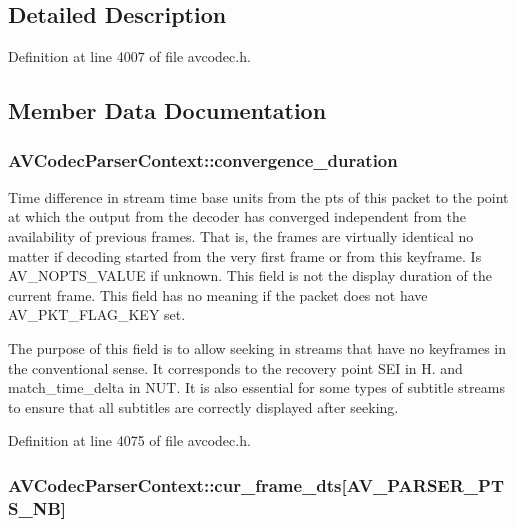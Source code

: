 \subsection{Detailed Description}


Definition at line 4007 of file avcodec.\+h.



\subsection{Member Data Documentation}
\subsubsection[{\texorpdfstring{convergence\+\_\+duration}{convergence_duration}}]{ A\+V\+Codec\+Parser\+Context\+::convergence\+\_\+duration}\hypertarget{struct_a_v_codec_parser_context_a720d361a167efcd43612fcf6ec57a2af}{}\label{struct_a_v_codec_parser_context_a720d361a167efcd43612fcf6ec57a2af}
Time difference in stream time base units from the pts of this packet to the point at which the output from the decoder has converged independent from the availability of previous frames. That is, the frames are virtually identical no matter if decoding started from the very first frame or from this keyframe. Is A\+V\+\_\+\+N\+O\+P\+T\+S\+\_\+\+V\+A\+L\+UE if unknown. This field is not the display duration of the current frame. This field has no meaning if the packet does not have A\+V\+\_\+\+P\+K\+T\+\_\+\+F\+L\+A\+G\+\_\+\+K\+EY set.

The purpose of this field is to allow seeking in streams that have no keyframes in the conventional sense. It corresponds to the recovery point S\+EI in H. and match\+\_\+time\+\_\+delta in N\+UT. It is also essential for some types of subtitle streams to ensure that all subtitles are correctly displayed after seeking. 

Definition at line 4075 of file avcodec.\+h.

\subsubsection[{\texorpdfstring{cur\+\_\+frame\+\_\+dts}{cur_frame_dts}}]{ A\+V\+Codec\+Parser\+Context\+::cur\+\_\+frame\+\_\+dts\mbox{[}{\bf A\+V\+\_\+\+P\+A\+R\+S\+E\+R\+\_\+\+P\+T\+S\+\_\+\+NB}\mbox{]}}\hypertarget{struct_a_v_codec_parser_context_a952b4e5e0f5422fb61c8a7bf3dd06afb}{}\label{struct_a_v_codec_parser_context_a952b4e5e0f5422fb61c8a7bf3dd06afb}


